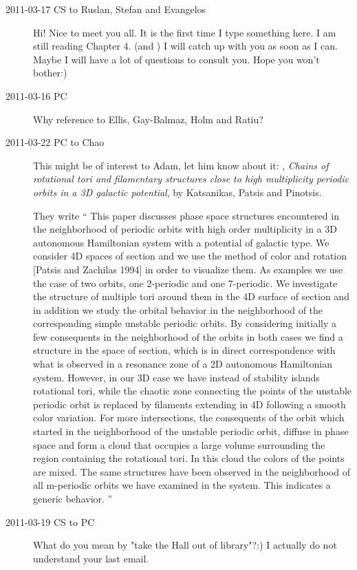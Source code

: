 \begin{description}
\item[2011-03-17 CS to Ruslan, Stefan and Evangelos]
   Hi! Nice to meet you all. It is the first time I type something here.
   I am still reading Chapter 4. (and ) I will catch up with
   you as soon as I can. Maybe I will have a lot of questions to consult
   you. Hope you won't bother:)

\item[2011-03-16 PC] Why reference to Ellis, Gay-Balmaz, Holm
                  and Ratiu?

\item[2011-03-22 PC to Chao]
This might be of interest to Adam, let him know about it:
,
\emph{Chains of rotational tori and filamentary structures close to high
 multiplicity periodic orbits in a 3D galactic potential},
 by Katsanikas, Patsis and Pinotsis.

They write
``
This paper discusses phase space structures encountered in the
neighborhood of periodic orbits with high order multiplicity in a 3D
autonomous Hamiltonian system with a potential of galactic type. We
consider 4D spaces of section and we use the method of color and rotation
[Patsis and Zachilas 1994] in order to visualize them. As examples we use
the case of two orbits, one 2-periodic and one 7-periodic. We investigate
the structure of multiple tori around them in the 4D surface of section
and in addition we study the orbital behavior in the neighborhood of the
corresponding simple unstable periodic orbits. By considering initially a
few consequents in the neighborhood of the orbits in both cases we find a
structure in the space of section, which is in direct correspondence with
what is observed in a resonance zone of a 2D autonomous Hamiltonian
system. However, in our 3D case we have instead of stability islands
rotational tori, while the chaotic zone connecting the points of the
unstable periodic orbit is replaced by filaments extending in 4D
following a smooth color variation. For more intersections, the
consequents of the orbit which started in the neighborhood of the
unstable periodic orbit, diffuse in phase space and form a cloud that
occupies a large volume surrounding the region containing the rotational
tori. In this cloud the colors of the points are mixed. The same
structures have been observed in the neighborhood of all m-periodic
orbits we have examined in the system. This indicates a generic behavior.
''

\item[2011-03-19 CS to PC]
What do you mean by "take the Hall out of library"?:) I actually do not
understand your last email.


\end{description}
